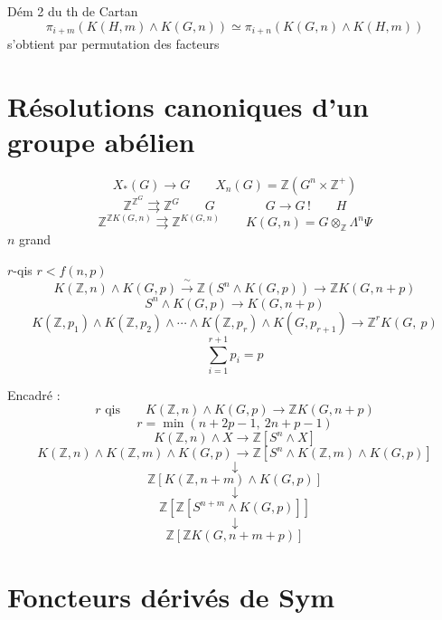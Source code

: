 \documentclass[11pt,a4paper]{article}
\begin{document}
Dém 2 du th de Cartan
\[
  \pi_{i+m}(K(H,m)\wedge K(G,n)) \simeq \pi_{i+n}(K(G,n)\wedge K(H,m))
\]
s'obtient par permutation des facteurs

\section{Résolutions canoniques d'un groupe abélien}


\[
  X_{\ast}(G) \longrightarrow G \qquad X_n(G) = \mathbb{Z}(G^n\times\mathbb{Z}^{+})
\]
\[
  \mathbb{Z}^{\mathbb{Z}^G} \rightrightarrows \mathbb{Z}^G \qquad G
  \qquad\qquad G \to G\,! \qquad H
\]
\[
  \mathbb{Z}^{\mathbb{Z}K(G,n)} \rightrightarrows \mathbb{Z}^{K(G,n)}
  \qquad K(G,n) = G\otimes_{\mathbb{Z}}\Lambda^n\Psi
\]
$n$  grand

$r$-qis \quad $r < f(n,p)$
\[
  K(\mathbb{Z},n)\wedge K(G,p) \xrightarrow{\ \sim\ } \mathbb{Z}(S^n\wedge K(G,p))
  \longrightarrow \mathbb{Z}K(G,n+p)
\]
\[
  S^n\wedge K(G,p) \to K(G,n+p)
\]
\[
  K(\mathbb{Z},p_1)\wedge K(\mathbb{Z},p_2)\wedge\cdots\wedge K(\mathbb{Z},p_r)\wedge K(G,p_{r+1})
  \to \mathbb{Z}^{r}K(G,\ p)
\]
\[
  \sum_{i=1}^{r+1} p_i = p
\]

Encadré :
\[
  r\text{ qis} \qquad K(\mathbb{Z},n)\wedge K(G,p) \longrightarrow \mathbb{Z}K(G,n+p)
\]
\[
  r = \min(n+2p-1,\ 2n+p-1)
\]
\[
  K(\mathbb{Z},n)\wedge X \to \mathbb{Z}[S^n\wedge X]
\]
\struck{\ill{}}
\[
  K(\mathbb{Z},n)\wedge K(\mathbb{Z},m)\wedge K(G,p) \to \mathbb{Z}[S^n\wedge K(\mathbb{Z},m)\wedge K(G,p)]
\]
\[
  \downarrow
\]
\[
  \mathbb{Z}[K(\mathbb{Z},n+m)\wedge K(G,p)]
\]
\[
  \downarrow
\]
\[
  \mathbb{Z}[\mathbb{Z}[S^{n+m}\wedge K(G,p)]]
\]
\[
  \downarrow
\]
\[
  \mathbb{Z}[\mathbb{Z}K(G,n+m+p)]
\]

\section{Foncteurs dérivés de Sym}

\end{document}
